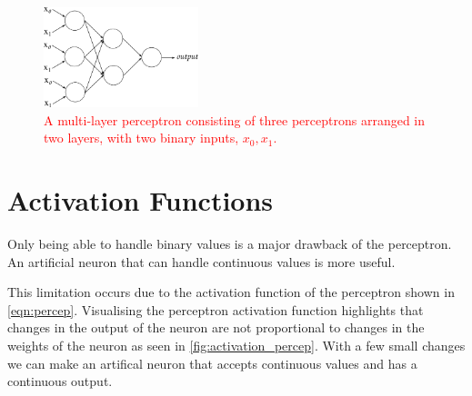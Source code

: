 \begin{figure}[h]
	\centering
	\includegraphics[width=0.4\textwidth]{Figs/intro2dl/mlp.png}
	
	\caption{\textcolor{red}{A multi-layer perceptron consisting of three perceptrons arranged in two layers, with two binary inputs, $x_0, x_1$.}}
	\label{fig:mlp}
\end{figure}

%
%

\section{Activation Functions}

Only being able to handle binary values is a major drawback of the perceptron. An artificial neuron that can handle continuous values is more useful.

This limitation occurs due to the activation function of the perceptron shown in \autoref{eqn:percep}. Visualising the perceptron activation function highlights that changes in the output of the neuron are not proportional to changes in the weights of the neuron as seen in \autoref{fig:activation_percep}. With a few small changes we can make an artifical neuron that accepts continuous values and has a continuous output.

